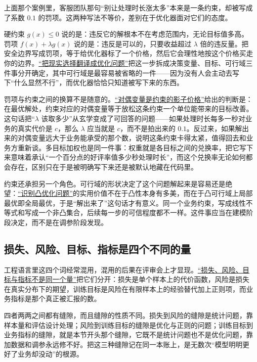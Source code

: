 上面那个案例里，客服团队那句``别让处理时长涨太多''本来是一条约束，却被写成了系数 \(0.1\) 的罚项。这两种写法不等价，差别在于优化器面对它们的态度。

硬约束 \(g(x)\le 0\) 说的是：违反它的解根本不在考虑范围内，无论目标值多高。罚项 \(f(x)+\lambda g(x)\) 说的是：违反是可以的，只要收益超过 \(\lambda\) 倍的违反量。把安全边界写成罚项，等于给优化器标了一个价格，然后它会理性地按这个价格买走你的边界。\hyperref[sec:09-Convex-Optimization/01-Optimization-Foundations/01]{``把现实选择翻译成优化问题''}把这一步拆成决策变量、目标、可行域三件事分开确定，其中可行域是最容易被省略的一件——因为没有人会主动去写下``什么显然不行''，而优化器恰恰只知道被写下来的东西。

罚项与约束之间的换算不是随意的。\hyperref[sec:09-Convex-Optimization/05-Duality/04]{``对偶变量是约束的影子价格''}给出的判断是：在最优解处，约束对应的对偶变量等于放松这条约束一个单位能带来的目标改善。这句话把``\(\lambda\) 该取多少''从玄学变成了可回答的问题——如果处理时长每多一秒对业务的真实代价是 \(c\)，那么 \(\lambda\) 应当就是 \(c\)，而不是拍出来的 \(0.1\)。反过来，如果解出来的对偶变量远大于业务能承受的那个数，说明这条约束卡得太紧，值得回去和业务方重新谈。多目标加权也是同一件事：权重就是各目标之间的兑换率，把它写下来意味着承认``一个百分点的好评率值多少秒处理时长''，而这个兑换率无论如何都会存在，区别只在于是被明确写下来还是被默认地藏在代码里。

约束还承担另一个角色。可行域的形状决定了这个问题解起来是容易还是绝望：\hyperref[ch:074]{``识别凸优化问题''}的实用价值不在于凸性本身有多美，而在于凸可行域上局部最优即全局最优，于是``解出来了''这句话才有意义。同一个业务约束，写成线性不等式和写成一个非凸集合，后续每一步的可信程度都不一样。这件事应当在建模阶段决定，而不是在调参阶段发现。

\subsection{损失、风险、目标、指标是四个不同的量}

工程语言里这四个词经常混用，混用的后果在评审会上才显现。\hyperref[sec:13-Machine-Learning/01-Learning-Problems-and-Evaluation/02]{``损失、风险、目标与指标不是同一个量''}把它们分开：损失是单个样本上的代价函数，风险是损失在真实分布下的期望，训练目标是风险在有限样本上的经验替代加上正则项，而业务指标是那个真正被汇报的数。

四者两两之间都有缝隙，而且缝隙的性质不同。损失到风险的缝隙是统计问题，靠样本量和评估设计处理；风险到训练目标的缝隙是优化与正则的问题；训练目标到业务指标的缝隙，就是本节开头那个缝隙，它既不是统计问题也不是优化问题，靠加数据和调参永远修不好。把这三种缝隙记在同一本账上，是无数次``模型明明更好了业务却没动''的根源。

